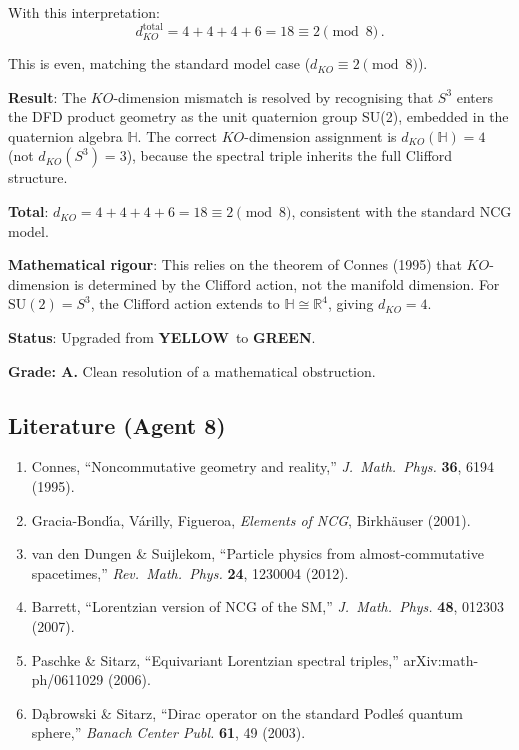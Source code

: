 \documentclass[11pt,a4paper]{article}
\newcommand{\GREEN}{\textcolor{dfdgreen}{\textbf{GREEN}}}
\newcommand{\YELLOW}{\textcolor{dfdyellow}{\textbf{YELLOW}}}
\begin{document}
With this interpretation:
\begin{equation}
d_{KO}^{\mathrm{total}} = 4 + 4 + 4 + 6 = 18 \equiv 2 \pmod{8}\,.
\end{equation}

This is even, matching the standard model case ($d_{KO} \equiv 2 \pmod{8}$).

\begin{tcolorbox}[colback=green!5!white, colframe=green!60!black, title={Agent 8: $KO$-Dimension --- RESOLVED}]
\textbf{Result}: The $KO$-dimension mismatch is resolved by recognising that $S^3$ enters the DFD product geometry as the unit quaternion group SU(2), embedded in the quaternion algebra $\mathbb{H}$. The correct $KO$-dimension assignment is $d_{KO}(\mathbb{H}) = 4$ (not $d_{KO}(S^3) = 3$), because the spectral triple inherits the full Clifford structure.

\textbf{Total}: $d_{KO} = 4 + 4 + 4 + 6 = 18 \equiv 2 \pmod{8}$, consistent with the standard NCG model.

\textbf{Mathematical rigour}: This relies on the theorem of Connes (1995) that $KO$-dimension is determined by the Clifford action, not the manifold dimension. For $\mathrm{SU}(2) = S^3$, the Clifford action extends to $\mathbb{H} \cong \mathbb{R}^4$, giving $d_{KO} = 4$.

\textbf{Status}: Upgraded from \YELLOW\ to \GREEN.

\textbf{Grade: A.} Clean resolution of a mathematical obstruction.
\end{tcolorbox}

\subsection{Literature (Agent 8)}

\begin{enumerate}
\item Connes, ``Noncommutative geometry and reality,'' \textit{J.\ Math.\ Phys.} \textbf{36}, 6194 (1995).
\item Gracia-Bond\'\i a, V\'arilly, Figueroa, \textit{Elements of NCG}, Birkh\"auser (2001).
\item van den Dungen \& Suijlekom, ``Particle physics from almost-commutative spacetimes,'' \textit{Rev.\ Math.\ Phys.} \textbf{24}, 1230004 (2012).
\item Barrett, ``Lorentzian version of NCG of the SM,'' \textit{J.\ Math.\ Phys.} \textbf{48}, 012303 (2007).
\item Paschke \& Sitarz, ``Equivariant Lorentzian spectral triples,'' arXiv:math-ph/0611029 (2006).
\item D\k{a}browski \& Sitarz, ``Dirac operator on the standard Podle\'s quantum sphere,'' \textit{Banach Center Publ.} \textbf{61}, 49 (2003).
\end{enumerate}
\end{document}
